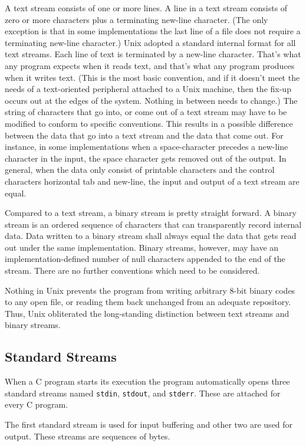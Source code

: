 A text stream consists of one or more lines. A line in a text stream consists
of zero or more characters plus a terminating new-line character. (The only
exception is that in some implementations the last line of a file does not
require a terminating new-line character.) Unix adopted a standard internal
format for all text streams. Each line of text is terminated by a new-line
character. That's what any program expects when it reads text, and that's what
any program produces when it writes text. (This is the most basic convention,
and if it doesn't meet the needs of a text-oriented peripheral attached to a
Unix machine, then the fix-up occurs out at the edges of the system. Nothing in
between needs to change.) The string of characters that go into, or come out of
a text stream may have to be modified to conform to specific conventions. This
results in a possible difference between the data that go into a text stream
and the data that come out. For instance, in some implementations when a
space-character precedes a new-line character in the input, the space character
gets removed out of the output. In general, when the data only consist of
printable characters and the control characters horizontal tab and new-line,
the input and output of a text stream are equal.

Compared to a text stream, a binary stream is pretty straight forward. A binary
stream is an ordered sequence of characters that can transparently record
internal data. Data written to a binary stream shall always equal the data that
gets read out under the same implementation. Binary streams, however, may have
an implementation-defined number of null characters appended to the end of the
stream. There are no further conventions which need to be considered.

Nothing in Unix prevents the program from writing arbitrary 8-bit binary codes
to any open file, or reading them back unchanged from an adequate repository.
Thus, Unix obliterated the long-standing distinction between text streams and
binary streams.

\subsection{Standard Streams}
When a C program starts its execution the program automatically opens three
standard streams named \texttt{stdin}, \texttt{stdout}, and \texttt{stderr}.
These are attached for every C program.

The first standard stream is used for input buffering and other two are used
for output. These streams are sequences of bytes.

